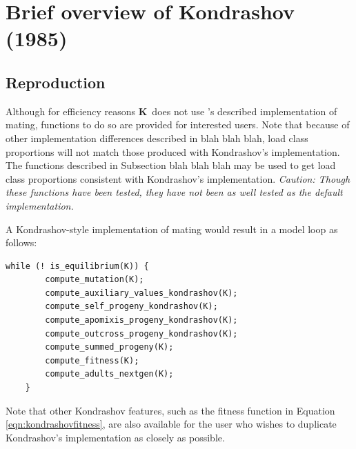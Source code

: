 \documentclass[10pt,twoside,a4paper,fleqn]{report}
\numberwithin{equation}{section}  %
\newcommand{\K}{{\bf K}}
\newcommand{\alphanv}{\mbox{$\alpha_{n,v}$}}
\newcommand{\SOijg}{\mbox{$SO_{i,j}(\gamma)$}}
\newcommand{\AOijg}{\mbox{$AO_{i,j}(\gamma)$}}
\newcommand{\OOijg}{\mbox{$OO_{i,j}(\gamma)$}}
\newcommand{\OPijg}{\mbox{$OP_{i,j}(\gamma)$}}
\newcommand{\SOnvx}{\mbox{$SO_{n,v}(\xi)$}}
\newcommand{\AOnvx}{\mbox{$AO_{n,v}(\xi)$}}
\newcommand{\OOnvx}{\mbox{$OO_{n,v}(\xi)$}}
\newcommand{\funcself}{\mbox{$s_{i,j}(n,v)$}}
\newcommand{\funcapomixis}{\mbox{$a_{i,j}(n,v)$}}
\newcommand{\funcoutcross}{\mbox{$o_{i,j}(n,v,l,m)$}}
\newcommand{\funcselfnested}{\mbox{$s_{i_0\/,j_0\/,i_1\/,j_1\/}(n_0\/,v_0\/,n_1\/,v_1\/)$}}
\newcommand{\funcapomixisnested}{\mbox{$a_{i_0\/,j_0\/,i_1\/,j_1\/}(n_0\/,v_0\/,n_1\/,v_1\/)$}}
\newcommand{\funcoutcrossnested}{\mbox{$o_{i_0\/,j_0\/,i_1\/,j_1\/}(n_0\/,v_0\/,l_0,m_0,n_1\/,v_1\/,l_1,m_1)$}}
\newcommand{\TSgx}{\mbox{$\mathcal{T}_{(S)\gamma}(\xi)$}}
\newcommand{\TAgx}{\mbox{$\mathcal{T}_{(A)\gamma}(\xi)$}}
\begin{document}
{%
\newcommand{\rhollam}{\mbox{$\rho_{l,\lambda}$}}
%
%
\newcommand{\OPllamz}{\mbox{$OP_{l,\lambda}(\zeta)$}}
%
%
%
\newcommand{\TOgxz}{\mbox{${\cal T}_{O}(\xi,\zeta,g)$}}

\section{Brief overview of Kondrashov (1985)}

\subsection{Reproduction}
Although for efficiency reasons \K\ does not use \citeauthor{Kondrashov:1985:5375}'s \citeyearpar{Kondrashov:1985:5375} described implementation of mating, functions to do so are provided for interested users.  Note that because of other implementation differences described in blah blah blah, load class proportions will not match those produced with Kondrashov's implementation.  The functions described in Subsection blah blah blah may be used to get load class proportions consistent with Kondrashov's implementation.  {\em Caution: Though these functions have been tested, they have not been as well tested as the default implementation.}

A Kondrashov-style implementation of mating would result in a model loop as follows:
\begin{lstlisting}[gobble=4,escapechar=|]
    while (! is_equilibrium(K)) {
        compute_mutation(K);
        compute_auxiliary_values_kondrashov(K);
        compute_self_progeny_kondrashov(K);
        compute_apomixis_progeny_kondrashov(K);
        compute_outcross_progeny_kondrashov(K);
        compute_summed_progeny(K);
        compute_fitness(K);
        compute_adults_nextgen(K);
    }
\end{lstlisting}
Note that other Kondrashov features, such as the fitness function in Equation \eqref{eqn:kondrashovfitness}, are also available for the user who wishes to duplicate Kondrashov's implementation as closely as possible.
}
\end{document}
